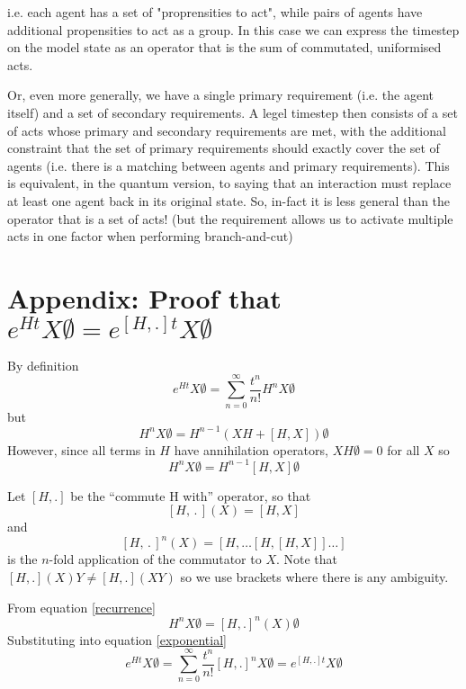 \documentclass{article}
\begin{document}
i.e. each agent has a set of "proprensities to act", while pairs of agents have additional propensities to act as a group. In this case we can express the timestep on the model state as an operator that is the sum of commutated, uniformised acts.

Or, even more generally, we have a single primary requirement (i.e. the agent itself) and a set of secondary requirements. A legel timestep then consists of a set of acts whose primary and secondary requirements are met, with the additional constraint that the set of primary requirements should exactly cover the set of agents (i.e. there is a matching between agents and primary requirements). This is equivalent, in the quantum version, to saying that an interaction must replace at least one agent back in its original state. So, in-fact it is less general than the operator that is a set of acts! (but the requirement allows us to activate multiple acts in one factor when performing branch-and-cut)


%
% 



\newpage
\appendix

\section{Appendix: Proof that $e^{Ht}X\emptyset = e^{[H,.]t}X\emptyset$}

By definition
\begin{equation}
e^{Ht}X\emptyset = \sum_{n=0}^\infty \frac{t^n}{n!} H^nX\emptyset
\label{exponential}
\end{equation}
but
\[
H^nX\emptyset = H^{n-1}(XH + [H,X])\emptyset
\]
However, since all terms in $H$ have annihilation operators, $XH\emptyset = 0$ for all $X$ so
\begin{equation}
H^nX\emptyset = H^{n-1}[H,X]\emptyset
\label{recurrence}
\end{equation}

Let $[H,.]$ be the ``commute H with'' operator, so that
\[
[H,\,.\,](X) = [H,X]
\]
and
\[
[H,\,.\,]^n(X) = [H,\dots [H,[H,X]]\dots ]
\]
is the $n$-fold application of the commutator to $X$. Note that $[H,.](X)Y \ne [H,.](XY)$ so we use brackets where there is any ambiguity.

From equation \ref{recurrence}
\[
H^nX\emptyset = [H,.]^n(X)\emptyset
\]
Substituting into equation \ref{exponential}
\begin{equation}
e^{Ht}X\emptyset = \sum_{n=0}^\infty \frac{t^n}{n!} [H,.]^n X\emptyset = e^{[H,.]t}X\emptyset
\label{Hcommutation}
\end{equation}
\end{document}
